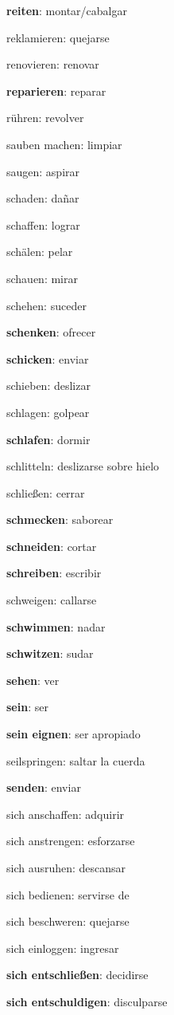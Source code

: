 \begin{multicols}{2}
\begin{myitemize}
\item \textbf{reiten}: montar/cabalgar
\item reklamieren: quejarse
\item renovieren: renovar
\item \textbf{reparieren}: reparar
\item rühren: revolver
\item sauben machen: limpiar
\item saugen: aspirar
\item schaden: dañar
\item schaffen: lograr
\item schälen: pelar 
\item schauen: mirar
\item schehen: suceder
\item \textbf{schenken}: ofrecer
\item \textbf{schicken}: enviar
\item schieben: deslizar
\item schlagen: golpear
\item \textbf{schlafen}: dormir
\item schlitteln: deslizarse sobre hielo
\item schließen: cerrar
\item \textbf{schmecken}: saborear
\item \textbf{schneiden}: cortar
\item \textbf{schreiben}: escribir
\item schweigen: callarse
\item \textbf{schwimmen}: nadar
\item \textbf{schwitzen}: sudar
\item \textbf{sehen}: ver
\item \textbf{sein}: ser
\item \textbf{sein eignen}: ser apropiado
\item seilspringen: saltar la cuerda
\item \textbf{senden}: enviar
\item sich anschaffen: adquirir
\item sich anstrengen: esforzarse
\item sich ausruhen: descansar
\item sich bedienen: servirse de
\item sich beschweren: quejarse
\item sich einloggen: ingresar
\item \textbf{sich entschließen}: decidirse
\item \textbf{sich entschuldigen}: disculparse

\end{myitemize}
\end{multicols}
